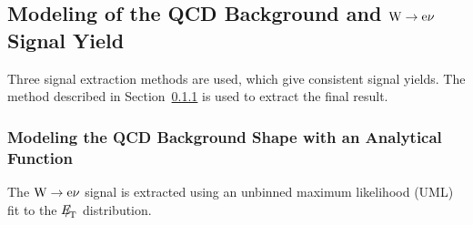 \subsection{\texorpdfstring{Modeling of the QCD Background and $\mathrm{W} \rightarrow \mathrm{e}\nu$ Signal Yield}{Modeling of the QCD Background and W-> e nu Signal Yield}}
\label{sec:WQCDbkg}

Three signal extraction methods are used, which give consistent
signal yields. The method described in Section~\ref{sec:AnalyticalFunction}
is used to extract the final result.

\subsubsection{Modeling the QCD Background Shape with an Analytical Function}
\label{sec:AnalyticalFunction}

The $\mathrm{W} \rightarrow \mathrm{e}\nu$ signal is extracted using an unbinned maximum likelihood
(UML) fit to the ${E\!\!\!/}_{\!\mathrm{T}}$ distribution.

